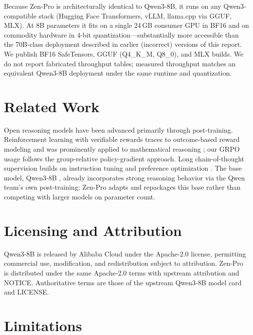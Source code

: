 \documentclass[11pt,a4paper]{article}
\begin{document}
Because Zen-Pro is architecturally identical to Qwen3-8B, it runs on any Qwen3-compatible stack
(Hugging Face Transformers, vLLM, llama.cpp via GGUF, MLX). At 8B parameters it fits on a single
24\,GB consumer GPU in BF16 and on commodity hardware in 4-bit quantization---substantially more
accessible than the 70B-class deployment described in earlier (incorrect) versions of this report.
We publish BF16 SafeTensors, GGUF (Q4\_K\_M, Q8\_0), and MLX builds. We do not report fabricated
throughput tables; measured throughput matches an equivalent Qwen3-8B deployment under the same
runtime and quantization.

\section{Related Work}

Open reasoning models have been advanced primarily through post-training. Reinforcement learning with
verifiable rewards traces to outcome-based reward modeling \cite{cobbe2021gsm8k} and was prominently
applied to mathematical reasoning \cite{lightman2023lets, shao2024deepseekmath}; our GRPO usage
follows the group-relative policy-gradient approach. Long chain-of-thought supervision builds on
instruction tuning \cite{wei2022finetuned} and preference optimization \cite{ouyang2022instructgpt,
rafailov2023dpo}. The base model, Qwen3-8B \cite{qwen3report}, already incorporates strong reasoning
behavior via the Qwen team's own post-training; Zen-Pro adapts and repackages this base rather than
competing with larger models on parameter count.

\section{Licensing and Attribution}

Qwen3-8B is released by Alibaba Cloud under the Apache-2.0 license, permitting commercial use,
modification, and redistribution subject to attribution. Zen-Pro is distributed under the same
Apache-2.0 terms with upstream attribution and NOTICE. Authoritative terms are those of the upstream
Qwen3-8B model card and LICENSE.

\section{Limitations}
\end{document}

